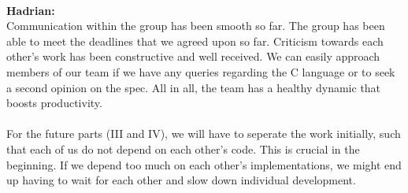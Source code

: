 \documentclass[a4paper]{article}
\begin{document}
\\
\textbf{Hadrian:}\\
Communication within the group has been smooth so far. The group has been able to meet the deadlines that we agreed upon so far. Criticism towards each other's work has been constructive and well received. We can easily approach members of our team if we have any queries regarding the C language or to seek a second opinion on the spec. All in all, the team has a healthy dynamic that boosts productivity.
\\\\
For the future parts (III and IV), we will have to seperate the work initially, such that each of us do not depend on each other's code. This is crucial in the beginning. If we depend too much on each other's implementations, we might end up having to wait for each other and slow down individual development.
\end{document}
